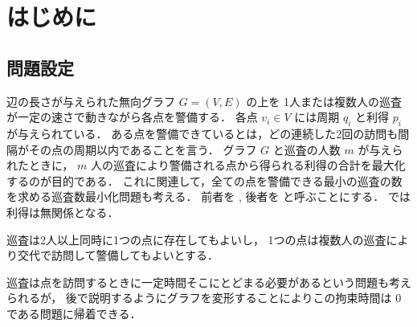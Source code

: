 
\section{はじめに}




\subsection{問題設定}
辺の長さが与えられた無向グラフ $G = (V,E)$ の上を
1人または複数人の巡査が一定の速さで動きながら各点を警備する．
各点 $v_i \in V$ には周期 $q_i$ と利得 $p_i$ が与えられている．
ある点を警備できているとは，どの連続した2回の訪問も間隔がその点の周期以内であることを言う．
グラフ $G$ と巡査の人数 $m$ が与えられたときに，
$m$ 人の巡査により警備される点から得られる利得の合計を最大化するのが目的である．
これに関連して，全ての点を警備できる最小の巡査の数を求める巡査数最小化問題も考える．
前者を \maxprofit, 後者を \minpatroller と呼ぶことにする．
\minpatroller では利得は無関係となる．

巡査は2人以上同時に1つの点に存在してもよいし，
1つの点は複数人の巡査により交代で訪問して警備してもよいとする．

巡査は点を訪問するときに一定時間そこにとどまる必要があるという問題も考えられるが，
後で説明するようにグラフを変形することによりこの拘束時間は $0$ である問題に帰着できる．



